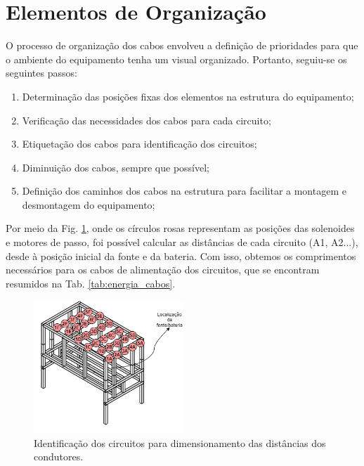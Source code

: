 \section{Elementos de Organização}

O processo de organização dos cabos envolveu a definição de prioridades para que o ambiente do equipamento tenha um visual organizado. Portanto, seguiu-se os seguintes passos:

\begin{enumerate}
    \item Determinação das posições fixas dos elementos na estrutura do equipamento;
    
    \item Verificação das necessidades dos cabos para cada circuito;
    
    \item Etiquetação dos cabos para identificação dos circuitos;
    
    \item Diminuição dos cabos, sempre que possível;
    
    \item Definição dos caminhos dos cabos na estrutura para facilitar a montagem e desmontagem do equipamento;
\end{enumerate}

Por meio da Fig. \ref{fig:energia_cabos}, onde os círculos rosas representam as posições das solenoides e motores de passo, foi possível calcular as distâncias de cada circuito (A1, A2...), desde à posição inicial da fonte e da bateria. Com isso, obtemos os comprimentos necessários para os cabos de alimentação dos circuitos, que se encontram resumidos na Tab. \ref{tab:energia_cabos}.

\begin{figure}[H]
    \centering
    \includegraphics[width=0.5\textwidth]{figuras/energia/circuitos/cabos.png}
   \caption{Identificação dos circuitos para dimensionamento das distâncias dos condutores.}
   \label{fig:energia_cabos}
   \end{figure}
   
